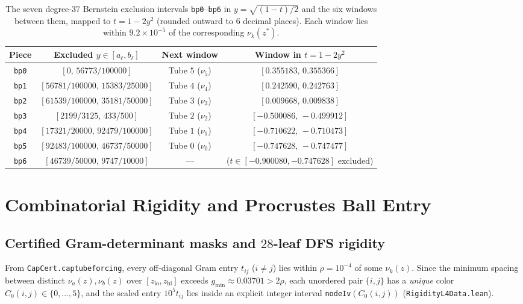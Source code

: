 \documentclass[11pt,reqno]{amsart}
\renewcommand{\_}{\origunderscore\allowbreak}
\theoremstyle{definition}
\begin{document}
\begin{table}[htbp]
  \centering
  \caption{The seven degree-$37$ Bernstein exclusion intervals \texttt{bp0}--\texttt{bp6} in $y = \sqrt{(1-t)/2}$ and the six windows between them, mapped to $t = 1 - 2y^2$ (rounded outward to $6$ decimal places). Each window lies within $9.2\times 10^{-5}$ of the corresponding $\nu_k(z^*)$.}
  \label{tab:bernstein}
  \small
  \renewcommand{\arraystretch}{1.15}
  \setlength{\tabcolsep}{4pt}
  \begin{tabular}{@{}cccc@{}}
    \toprule
    Piece & Excluded $y \in [a_\ell, b_\ell]$ & Next window & Window in $t = 1-2y^2$ \\
    \midrule
    \texttt{bp0} & $[0,\, 56773/100000]$           & Tube $5$ ($\nu_5$) & $[0.355183,\, 0.355366]$ \\
    \texttt{bp1} & $[56781/100000,\, 15383/25000]$ & Tube $4$ ($\nu_4$) & $[0.242590,\, 0.242763]$ \\
    \texttt{bp2} & $[61539/100000,\, 35181/50000]$ & Tube $3$ ($\nu_3$) & $[0.009668,\, 0.009838]$ \\
    \texttt{bp3} & $[2199/3125,\, 433/500]$        & Tube $2$ ($\nu_2$) & $[-0.500086,\, -0.499912]$ \\
    \texttt{bp4} & $[17321/20000,\, 92479/100000]$ & Tube $1$ ($\nu_1$) & $[-0.710622,\, -0.710473]$ \\
    \texttt{bp5} & $[92483/100000,\, 46737/50000]$ & Tube $0$ ($\nu_0$) & $[-0.747628,\, -0.747477]$ \\
    \texttt{bp6} & $[46739/50000,\, 9747/10000]$   & ---                & ($t \in [-0.900080, -0.747628]$ excluded) \\
    \bottomrule
  \end{tabular}
\end{table}

\section{Combinatorial Rigidity and Procrustes Ball Entry}\label{sec:rigidity}

\subsection{Certified Gram-determinant masks and $28$-leaf DFS rigidity}\label{subsec:l4-dfs}
From \texttt{CapCert.cap\_tube\_forcing}, every off-diagonal Gram entry $t_{ij}$ ($i \ne j$) lies within $\rho = 10^{-4}$ of some $\nu_k(z)$.
Since the minimum spacing between distinct $\nu_a(z), \nu_b(z)$ over $[z_{\mathrm{lo}}, z_{\mathrm{hi}}]$ exceeds $g_{\min} \approx 0.03701 > 2\rho$, each unordered pair $\{i,j\}$ has a \emph{unique} color $C_0(i,j) \in \{0,\dots,5\}$, and the scaled entry $10^5 t_{ij}$ lies inside an explicit integer interval \texttt{nodeIv}$(C_0(i,j))$ (\texttt{RigidityL4Data.lean}).
\end{document}
